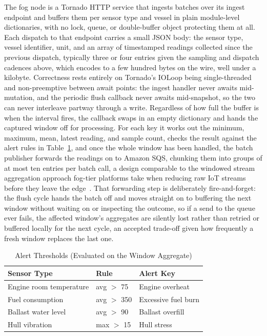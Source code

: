 \documentclass[conference]{IEEEtran}
\begin{document}
The fog node is a Tornado HTTP service that ingests batches over its ingest endpoint and buffers them per sensor type and vessel in plain module-level dictionaries, with no lock, queue, or double-buffer object protecting them at all. Each dispatch to that endpoint carries a small JSON body: the sensor type, vessel identifier, unit, and an array of timestamped readings collected since the previous dispatch, typically three or four entries given the sampling and dispatch cadences above, which encodes to a few hundred bytes on the wire, well under a kilobyte. Correctness rests entirely on Tornado's IOLoop being single-threaded and non-preemptive between await points: the ingest handler never awaits mid-mutation, and the periodic flush callback never awaits mid-snapshot, so the two can never interleave partway through a write. Regardless of how full the buffer is when the interval fires, the callback swaps in an empty dictionary and hands the captured window off for processing. For each key it works out the minimum, maximum, mean, latest reading, and sample count, checks the result against the alert rules in Table~\ref{tab:alerts}, and once the whole window has been handled, the batch publisher forwards the readings on to Amazon SQS, chunking them into groups of at most ten entries per batch call, a design comparable to the windowed stream aggregation approach fog-tier platforms take when reducing raw IoT streams before they leave the edge~\cite{ref4}. That forwarding step is deliberately fire-and-forget: the flush cycle hands the batch off and moves straight on to buffering the next window without waiting on or inspecting the outcome, so if a send to the queue ever fails, the affected window's aggregates are silently lost rather than retried or buffered locally for the next cycle, an accepted trade-off given how frequently a fresh window replaces the last one.

\begin{table}[!t]
\caption{Alert Thresholds (Evaluated on the Window Aggregate)}
\label{tab:alerts}
\centering
\scriptsize
\setlength{\tabcolsep}{4pt}
\begin{tabular}{|l|l|l|}
\hline
\textbf{Sensor Type} & \textbf{Rule} & \textbf{Alert Key} \\
\hline
Engine room temperature & avg $>$ 75 & Engine overheat \\
\hline
Fuel consumption & avg $>$ 350 & Excessive fuel burn \\
\hline
Ballast water level & avg $>$ 90 & Ballast overfill \\
\hline
Hull vibration & max $>$ 15 & Hull stress \\
\hline
\end{tabular}
\end{table}
\end{document}
